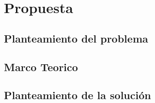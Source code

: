 \section{Propuesta}
\subsection{Planteamiento del problema}
\subsection{Marco Teorico}
\subsection{Planteamiento de la solución}

